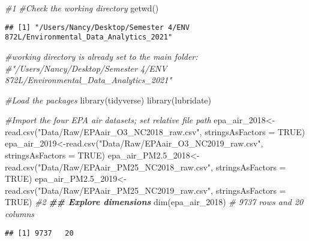 \documentclass[
]{article}
\newenvironment{Shaded}{\begin{snugshade}}{\end{snugshade}}
\newcommand{\AttributeTok}[1]{\textcolor[rgb]{0.77,0.63,0.00}{#1}}
\newcommand{\CommentTok}[1]{\textcolor[rgb]{0.56,0.35,0.01}{\textit{#1}}}
\newcommand{\ConstantTok}[1]{\textcolor[rgb]{0.00,0.00,0.00}{#1}}
\newcommand{\DocumentationTok}[1]{\textcolor[rgb]{0.56,0.35,0.01}{\textbf{\textit{#1}}}}
\newcommand{\FloatTok}[1]{\textcolor[rgb]{0.00,0.00,0.81}{#1}}
\newcommand{\FunctionTok}[1]{\textcolor[rgb]{0.00,0.00,0.00}{#1}}
\newcommand{\NormalTok}[1]{#1}
\newcommand{\OtherTok}[1]{\textcolor[rgb]{0.56,0.35,0.01}{#1}}
\newcommand{\StringTok}[1]{\textcolor[rgb]{0.31,0.60,0.02}{#1}}
\begin{document}
\begin{Shaded}
\begin{Highlighting}[]
\CommentTok{\#1}
\CommentTok{\#Check the working directory}
\FunctionTok{getwd}\NormalTok{()}
\end{Highlighting}
\end{Shaded}

\begin{verbatim}
## [1] "/Users/Nancy/Desktop/Semester 4/ENV 872L/Environmental_Data_Analytics_2021"
\end{verbatim}

\begin{Shaded}
\begin{Highlighting}[]
\CommentTok{\#working directory is already set to the main folder: }
\CommentTok{\#"/Users/Nancy/Desktop/Semester 4/ENV 872L/Environmental\_Data\_Analytics\_2021"}

\CommentTok{\#Load the packages}
\FunctionTok{library}\NormalTok{(tidyverse)}
\FunctionTok{library}\NormalTok{(lubridate)}

\CommentTok{\#Import the four EPA air datasets; set relative file path}
\NormalTok{epa\_air\_2018}\OtherTok{\textless{}{-}}\FunctionTok{read.csv}\NormalTok{(}\StringTok{"Data/Raw/EPAair\_O3\_NC2018\_raw.csv"}\NormalTok{, }
                       \AttributeTok{stringsAsFactors =} \ConstantTok{TRUE}\NormalTok{)}
\NormalTok{epa\_air\_2019}\OtherTok{\textless{}{-}}\FunctionTok{read.csv}\NormalTok{(}\StringTok{"Data/Raw/EPAair\_O3\_NC2019\_raw.csv"}\NormalTok{, }
                       \AttributeTok{stringsAsFactors =} \ConstantTok{TRUE}\NormalTok{)}
\NormalTok{epa\_air\_PM2}\FloatTok{.5}\NormalTok{\_2018}\OtherTok{\textless{}{-}}\FunctionTok{read.csv}\NormalTok{(}\StringTok{"Data/Raw/EPAair\_PM25\_NC2018\_raw.csv"}\NormalTok{, }
                             \AttributeTok{stringsAsFactors =} \ConstantTok{TRUE}\NormalTok{)}
\NormalTok{epa\_air\_PM2}\FloatTok{.5}\NormalTok{\_2019}\OtherTok{\textless{}{-}}\FunctionTok{read.csv}\NormalTok{(}\StringTok{"Data/Raw/EPAair\_PM25\_NC2019\_raw.csv"}\NormalTok{, }
                             \AttributeTok{stringsAsFactors =} \ConstantTok{TRUE}\NormalTok{)}
\CommentTok{\#2 }
\DocumentationTok{\#\# Explore dimensions}
\FunctionTok{dim}\NormalTok{(epa\_air\_2018) }\CommentTok{\# 9737 rows and 20 columns}
\end{Highlighting}
\end{Shaded}

\begin{verbatim}
## [1] 9737   20
\end{verbatim}
\end{document}
